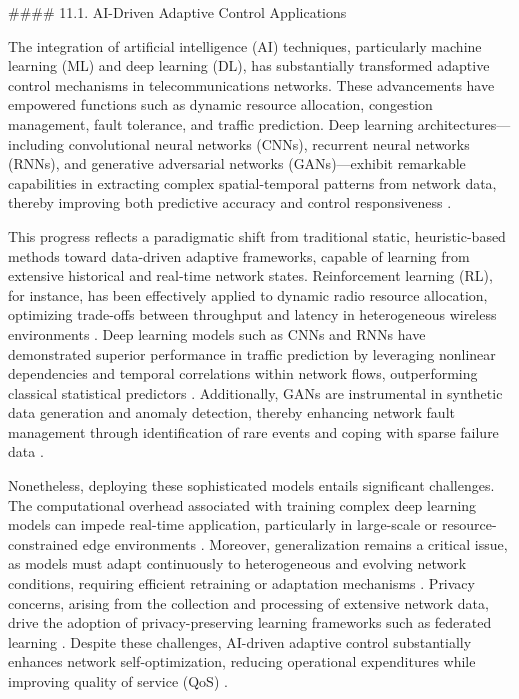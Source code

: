 \documentclass[11pt]{article}
\begin{document}
\begin{itemize}
#### 11.1. AI-Driven Adaptive Control Applications

The integration of artificial intelligence (AI) techniques, particularly machine learning (ML) and deep learning (DL), has substantially transformed adaptive control mechanisms in telecommunications networks. These advancements have empowered functions such as dynamic resource allocation, congestion management, fault tolerance, and traffic prediction. Deep learning architectures—including convolutional neural networks (CNNs), recurrent neural networks (RNNs), and generative adversarial networks (GANs)—exhibit remarkable capabilities in extracting complex spatial-temporal patterns from network data, thereby improving both predictive accuracy and control responsiveness \cite{1,2,3,4,5,6,7,10,11,14,50}.

This progress reflects a paradigmatic shift from traditional static, heuristic-based methods toward data-driven adaptive frameworks, capable of learning from extensive historical and real-time network states. Reinforcement learning (RL), for instance, has been effectively applied to dynamic radio resource allocation, optimizing trade-offs between throughput and latency in heterogeneous wireless environments \cite{1,7}. Deep learning models such as CNNs and RNNs have demonstrated superior performance in traffic prediction by leveraging nonlinear dependencies and temporal correlations within network flows, outperforming classical statistical predictors \cite{2,3,5}. Additionally, GANs are instrumental in synthetic data generation and anomaly detection, thereby enhancing network fault management through identification of rare events and coping with sparse failure data \cite{6,10}.

Nonetheless, deploying these sophisticated models entails significant challenges. The computational overhead associated with training complex deep learning models can impede real-time application, particularly in large-scale or resource-constrained edge environments \cite{4,5}. Moreover, generalization remains a critical issue, as models must adapt continuously to heterogeneous and evolving network conditions, requiring efficient retraining or adaptation mechanisms \cite{7}. Privacy concerns, arising from the collection and processing of extensive network data, drive the adoption of privacy-preserving learning frameworks such as federated learning \cite{10,11}. Despite these challenges, AI-driven adaptive control substantially enhances network self-optimization, reducing operational expenditures while improving quality of service (QoS) \cite{14,50}.


\end{itemize}
\end{document}

